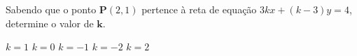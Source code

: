 Sabendo que o ponto $ \mathbf{P}(2, 1) $ pertence à reta de equação $ 3kx + (k - 3)y = 4 $, determine o valor de $\mathbf{k}$.

$k=1$
$k=0$
$k=-1$
$k=-2$
$k=2$





